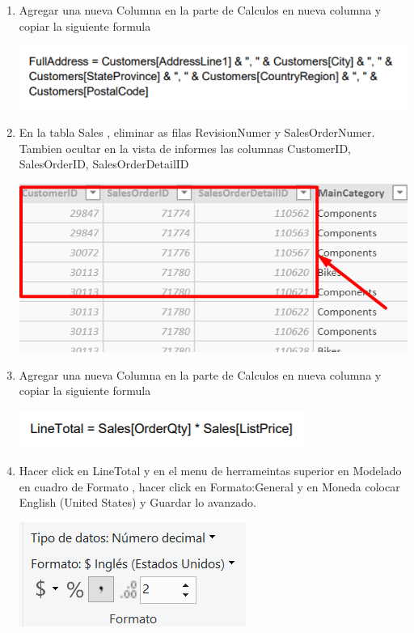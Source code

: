 \begin{itemize}
\begin{enumerate}
\item Agregar una nueva Columna en la parte de Calculos en nueva columna y copiar la siguiente formula

\begin{center}
\includegraphics[scale=1]{./Imagenes/tarea2_formula.png}
\end{center}

\item En la tabla Sales , eliminar as filas RevisionNumer y SalesOrderNumer. Tambien ocultar en la vista de informes las columnas CustomerID, SalesOrderID, SalesOrderDetailID
\begin{center}
\includegraphics[scale=0.55]{./Imagenes/29.png}
\end{center}

\item Agregar una nueva Columna en la parte de Calculos en nueva columna y copiar la siguiente formula

\begin{center}
\includegraphics[scale=1]{./Imagenes/tarea2_formula2.png}
\end{center}

\item Hacer click en LineTotal	 y en el menu de herrameintas superior  en Modelado en cuadro de Formato , hacer click en Formato:General y en Moneda colocar English (United States) y Guardar lo avanzado.

\begin{center}
\includegraphics[scale=1]{./Imagenes/31.png}
\end{center}


\end{enumerate}
\end{itemize}
